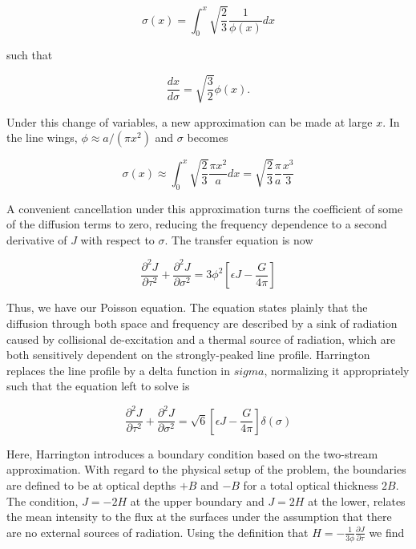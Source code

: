 \documentclass[onecolumn]{aastex63}
\begin{document}
\begin{equation}
    \sigma(x) = \int_0^x \sqrt{\frac{2}{3}}\frac{1}{\phi(x)}dx
\end{equation}

such that

\begin{equation}
    \frac{dx}{d\sigma} = \sqrt{\frac{3}{2}}\phi(x).
\end{equation}

Under this change of variables, a new approximation can be made at large $x$. In the line wings, $\phi \approx a/(\pi x^2)$ and $\sigma$ becomes

\begin{equation}
    \sigma(x) \approx \int_0^x \sqrt{\frac{2}{3}}\frac{\pi x^2}{a}dx = \sqrt{\frac{2}{3}} \frac{\pi}{a}\frac{x^3}{3}
\end{equation}

A convenient cancellation under this approximation turns the coefficient of some of the diffusion terms to zero, reducing the frequency dependence to a second derivative of $J$ with respect to $\sigma$. The transfer equation is now

\begin{equation}
    \frac{\partial^2J}{\partial \tau ^2} + \frac{\partial ^2 J}{\partial \sigma^2} = 3\phi^2 \left[\epsilon J - \frac{G}{4\pi}\right]
\end{equation}

Thus, we have our Poisson equation. The equation states plainly that the diffusion through both space and frequency are described by a sink of radiation caused by collisional de-excitation and a thermal source of radiation, which are both sensitively dependent on the strongly-peaked line profile. Harrington replaces the line profile by a delta function in $sigma$, normalizing it appropriately such that the equation left to solve is 

\begin{equation}
    \frac{\partial^2J}{\partial \tau ^2} + \frac{\partial ^2 J}{\partial \sigma^2} = \sqrt{6} \left[\epsilon J - \frac{G}{4\pi}\right]\delta(\sigma)
\end{equation}

Here, Harrington introduces a boundary condition based on the two-stream approximation. With regard to the physical setup of the problem, the boundaries are defined to be at optical depths $+B$ and $-B$ for a total optical thickness $2B$. The condition, $J=-2H$ at the upper boundary and $J=2H$ at the lower, relates the mean intensity to the flux at the surfaces under the assumption that there are no external sources of radiation. Using the definition that $H = -\frac{1}{3\phi}\frac{\partial J}{\partial \tau}$ we find
\end{document}
